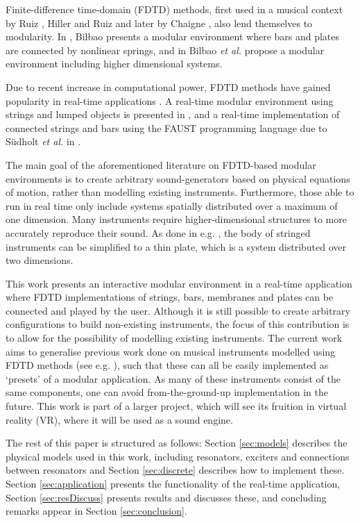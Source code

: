 \documentclass{article}
\begin{document}
Finite-difference time-domain (FDTD) methods, first used in a musical context by Ruiz \cite{Ruiz1969}, Hiller and Ruiz \cite{Hiller1971I, Hiller1971II} and later by Chaigne \cite{Chaigne1992}, also lend themselves to modularity. In \cite{Bilbao2009Modular}, Bilbao presents a modular environment where bars and plates are connected by nonlinear springs, and in \cite{Bilbao2014} Bilbao \textit{et al.} propose a modular environment including higher dimensional systems.

Due to recent increase in computational power, FDTD methods have gained popularity in real-time applications \cite{WillemsenThesis}. A real-time modular environment using strings and lumped objects is presented in \cite{Bilbao2019}, and a real-time implementation of connected strings and bars using the FAUST programming language due to S\"udholt \textit{et al.} in \cite{Sudholt2021}. 

The main goal of the aforementioned literature on FDTD-based modular environments is to create arbitrary sound-generators based on physical equations of motion, rather than modelling existing instruments. Furthermore, those able to run in real time only include systems spatially distributed over a maximum of one dimension. Many instruments require higher-dimensional structures to more accurately reproduce their sound. As done in e.g. \cite{Willemsen2019, Willemsen2020}, the body of stringed instruments can be simplified to a thin plate, which is a system distributed over two dimensions. 

This work presents an interactive modular environment in a real-time application where FDTD implementations of strings, bars, membranes and plates can be connected and played by the user. Although it is still possible to create arbitrary configurations to build non-existing instruments, the focus of this contribution is to allow for the possibility of modelling existing instruments. The current work aims to generalise previous work done on musical instruments modelled using FDTD methods (see e.g. \cite{Willemsen2019, Willemsen2020, Lasickas2021, Sudholt2021Langeleik, Mosen2021}), such that these can all be easily implemented as `presets' of a modular application. As many of these instruments consist of the same components, one can avoid from-the-ground-up implementation in the future. This work is part of a larger project, which will see its fruition in virtual reality (VR), where it will be used as a sound engine.

The rest of this paper is structured as follows: Section \ref{sec:models} describes the physical models used in this work, including resonators, exciters and connections between resonators and Section \ref{sec:discrete} describes how to implement these. Section \ref{sec:application} presents the functionality of the real-time application, Section \ref{sec:resDiscuss} presents results and discusses these, and concluding remarks appear in Section \ref{sec:conclusion}.
\end{document}
